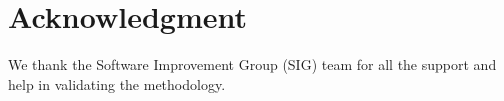 \documentclass[10pt,conference]{IEEEtran}
\begin{document}
\section*{Acknowledgment}\label{sec:ack}

\noindent
We thank the Software Improvement Group (SIG) team for all the support and
help in validating the methodology.

\balance

{
 
  
}
\end{document}
